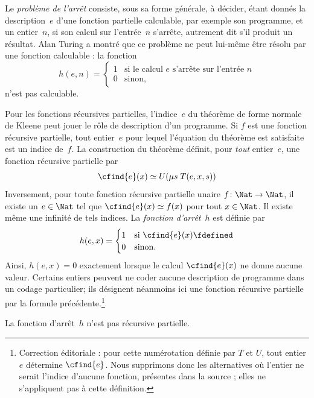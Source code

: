 \documentclass[../../../include/open-logic-section]{subfiles}
\begin{document}

Le \emph{problème de l'arrêt} consiste, sous sa forme générale,
à décider, étant donnés la description~$e$ d'une fonction
partielle calculable, par exemple son programme, et un entier~$n$,
si son calcul sur l'entrée~$n$ s'arrête, autrement dit s'il
produit un résultat. Alan Turing a montré que ce problème
ne peut lui-même être résolu par une fonction calculable :
la fonction
\[
h(e, n) =
\begin{cases}
1 & \text{si le calcul $e$ s'arrête sur l'entrée $n$}\\
0 & \text{sinon,}
\end{cases}
\]
n'est pas calculable.

Pour les fonctions récursives partielles, l'indice~$e$ du
théorème de forme normale de Kleene peut jouer le rôle
de description d'un programme. Si $f$ est une fonction
récursive partielle, tout entier~$e$ pour lequel l'équation
du théorème est satisfaite est un indice de~$f$. La
construction du théorème définit, pour \emph{tout}
entier~$e$, une fonction récursive partielle par
\[
\cfind{e}(x) \simeq U(\mu s \; T(e, x, s))
\]
Inversement, pour toute fonction récursive partielle unaire
$f\colon \Nat \to \Nat$, il existe un $e \in \Nat$ tel que
$\cfind{e}(x) \simeq f(x)$ pour tout $x \in \Nat$.
Il existe même une infinité de tels indices. La
\emph{fonction d'arrêt}~$h$ est définie par
\[
h(e, x) =
\begin{cases}
1 & \text{si $\cfind{e}(x) \fdefined$}\\
0 & \text{sinon.}
\end{cases}
\]
Ainsi, $h(e,x)=0$ exactement lorsque le calcul
$\cfind{e}(x)$ ne donne aucune valeur. Certains entiers
peuvent ne coder aucune description de programme dans un
codage particulier; ils désignent néanmoins ici une
fonction récursive partielle par la formule précédente.\footnote{Correction éditoriale : pour cette numérotation définie par $T$ et $U$, tout entier $e$ détermine $\cfind{e}$. Nous supprimons donc les alternatives où l'entier ne serait l'indice d'aucune fonction, présentes dans la source ; elles ne s'appliquent pas à cette définition.}

\begin{thm}
La fonction d'arrêt~$h$ n'est pas récursive partielle.
\end{thm}
\end{document}
